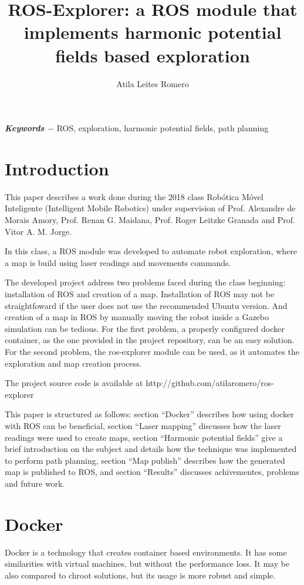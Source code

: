 \documentclass[a4paper,twocolumn]{article}
\title{ROS-Explorer: a ROS module that implements harmonic potential fields based exploration}
\author{Atila Leites Romero}
\begin{document}
\maketitle

\begin{abstract}
\end{abstract}

{
    \par	
    \textbf{\textit{Keywords $-$}} 
    ROS, exploration, harmonic potential fields, path planning
}

\section{Introduction}
    This paper describes a work done during the 2018 class Robótica Móvel Inteligente (Intelligent Mobile Robotics) under supervision of Prof. Alexandre de Morais Amory, Prof. Renan G. Maidana, Prof. Roger Leitzke Granada and Prof. Vitor A. M. Jorge.
    
    In this class, a ROS module was developed to automate robot exploration, where a map is build using laser readings and movements commands.

    The developed project address two problems faced during the class beginning: installation of ROS and creation of a map. Installation of ROS may not be straightfoward if the user does not use the recommended Ubuntu version. And creation of a map in ROS by manually moving the robot inside a Gazebo simulation can be tedious. For the first problem, a properly configured docker container, as the one provided in the project repository, can be an easy solution. For the second problem, the ros-explorer module can be used, as it automates the exploration and map creation process.

    The project source code is available at http://github.com/atilaromero/ros-explorer

    This paper is structured as follows: section ``Docker'' describes how using docker with ROS can be beneficial, section ``Laser mapping'' discusses how the laser readings were used to create maps, section ``Harmonic potential fields'' give a brief introduction on the subject and details how the technique was implemented to perform path planning, section ``Map publish'' describes how the generated map is published to ROS, and section ``Results'' discusses achivementes, problems and future work.

\section{Docker}
    Docker is a technology that creates container based environments. It has some similarities with virtual machines, but without the performance loss. It may be also compared to chroot solutions, but its usage is more robust and simple.
\end{document}
